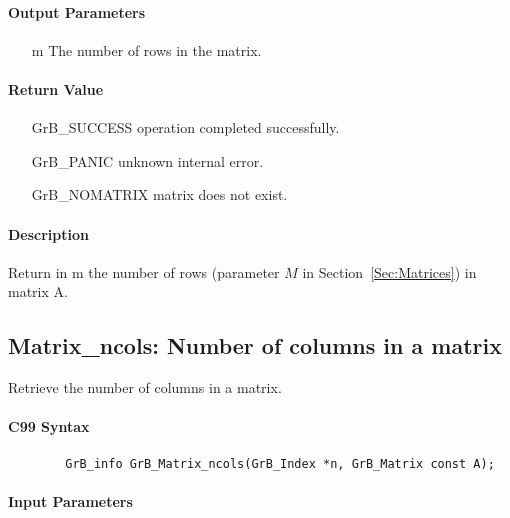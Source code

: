 \paragraph{Output Parameters}
\begin{itemize}[leftmargin=1.1in]
    \item[{\sf m}] The number of rows in the matrix.
\end{itemize}

\paragraph{Return Value}

\begin{itemize}[leftmargin=2.1in]
\item[{\sf GrB\_SUCCESS}]   operation completed successfully.
\item[{\sf GrB\_PANIC}]     unknown internal error.
\item[{\sf GrB\_NOMATRIX}]  matrix does not exist.
\end{itemize}

\paragraph{Description}

Return in {\sf m} the number of rows (parameter $M$ in Section~\ref{Sec:Matrices}) in matrix {\sf A}.

\subsection{{\sf Matrix\_ncols}: Number of columns in a matrix}

Retrieve the number of columns in a matrix.

\paragraph{C99 Syntax}

\begin{verbatim}
        GrB_info GrB_Matrix_ncols(GrB_Index *n, GrB_Matrix const A);
\end{verbatim}

\paragraph{Input Parameters}

